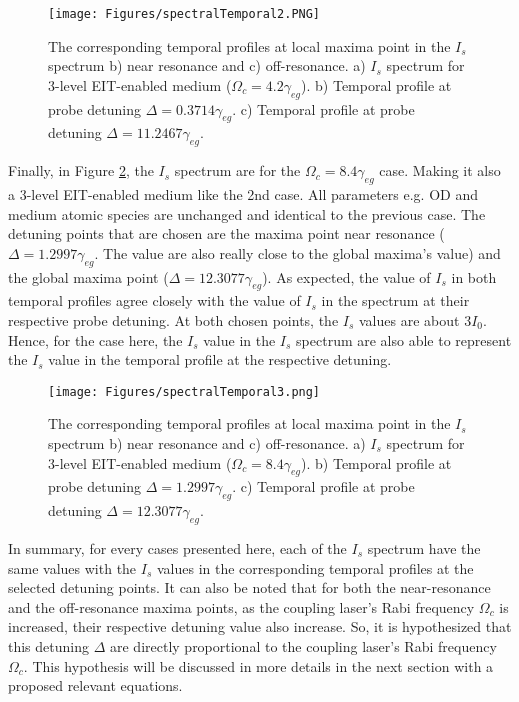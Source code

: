 \begin{figure}[h!]
    \centering
     \texttt{[image: Figures/spectralTemporal2.PNG]}
    \caption{The corresponding temporal profiles at local maxima point in the $I_{s}$ spectrum b) near resonance and c) off-resonance. a) $I_{s}$ spectrum for 3-level EIT-enabled medium ($\Omega_{c} = 4.2\gamma_{eg}$). b) Temporal profile at probe detuning $\Delta = 0.3714\gamma_{eg}$. c) Temporal profile at probe detuning $\Delta = 11.2467\gamma_{eg}$.}
    \label{fig: corresponding temporal profile 2}
\end{figure}

Finally, in Figure \ref{fig: corresponding temporal profile 3}, the $I_{s}$ spectrum are for the $\Omega_{c} = 8.4\gamma_{eg}$ case. Making it also a 3-level EIT-enabled medium like the 2nd case. All parameters e.g. OD and medium atomic species are unchanged and identical to the previous case. The detuning points that are chosen are the maxima point near resonance ($\Delta = 1.2997\gamma_{eg}$. The value are also really close to the global maxima's value) and the global maxima point ($\Delta = 12.3077\gamma_{eg}$). As expected, the value of $I_{s}$ in both temporal profiles agree closely with the value of $I_{s}$ in the spectrum at their respective probe detuning. At both chosen points, the $I_{s}$ values are about $3I_{0}$. Hence, for the case here, the $I_{s}$ value in the $I_{s}$ spectrum are also able to represent the $I_{s}$ value in the temporal profile at the respective detuning.

\begin{figure}[h!]
    \centering
    \texttt{[image: Figures/spectralTemporal3.png]}
    \caption{The corresponding temporal profiles at local maxima point in the $I_{s}$ spectrum b) near resonance and c) off-resonance. a) $I_{s}$ spectrum for 3-level EIT-enabled medium ($\Omega_{c} = 8.4\gamma_{eg}$). b) Temporal profile at probe detuning $\Delta = 1.2997\gamma_{eg}$. c) Temporal profile at probe detuning $\Delta = 12.3077\gamma_{eg}$.}
    \label{fig: corresponding temporal profile 3}
\end{figure}

In summary, for every cases presented here, each of the $I_{s}$ spectrum have the same values with the $I_{s}$ values in the corresponding temporal profiles at the selected detuning points. It can also be noted that for both the near-resonance and the off-resonance maxima points, as the coupling laser's Rabi frequency $\Omega_{c}$ is increased, their respective detuning value also increase. So, it is hypothesized that this detuning $\Delta$ are directly proportional to the coupling laser's Rabi frequency $\Omega_{c}$. This hypothesis will be discussed in more details in the next section with a proposed relevant equations.


